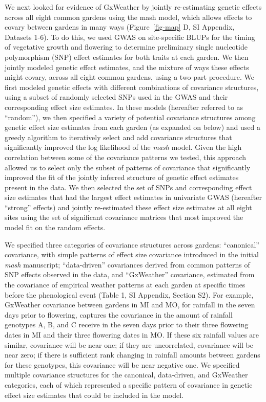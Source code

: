 \documentclass[
  9pt,
  twocolumn,
  twoside]{pnas-new}
\begin{document}
We next looked for evidence of GxWeather by jointly re-estimating
genetic effects across all eight common gardens using the mash model,
which allows effects to covary between gardens in many ways
(Figure~\ref{fig-map} D, SI Appendix, Datasets 1-6). To do this, we used
GWAS on site-specific BLUPs for the timing of vegetative growth and
flowering to determine preliminary single nucleotide polymorphism (SNP)
effect estimates for both traits at each garden. We then jointly modeled
genetic effect estimates, and the mixture of ways these effects might
covary, across all eight common gardens, using a two-part procedure. We
first modeled genetic effects with different combinations of covariance
structures, using a subset of randomly selected SNPs used in the GWAS
and their corresponding effect size estimates. In these models
(hereafter referred to as ``random''), we then specified a variety of
potential covariance structures among genetic effect size estimates from
each garden (as expanded on below) and used a greedy algorithm to
iteratively select and add covariance structures that significantly
improved the log likelihood of the \emph{mash} model. Given the high
correlation between some of the covariance patterns we tested, this
approach allowed us to select only the subset of patterns of covariance
that significantly improved the fit of the jointly inferred structure of
genetic effect estimates present in the data. We then selected the set
of SNPs and corresponding effect size estimates that had the largest
effect estimates in univariate GWAS (hereafter ``strong'' effects) and
jointly re-estimated these effect size estimates at all eight sites
using the set of significant covariance matrices that most improved the
model fit on the random effects.

We specified three categories of covariance structures across gardens:
``canonical'' covariance, with simple patterns of effect size covariance
introduced in the initial \emph{mash} manuscript; ``data-driven''
covariances derived from common patterns of SNP effects observed in the
data, and ``GxWeather'' covariance, estimated from the covariance of
empirical weather patterns at each garden at specific times before the
phenological event (Table 1, SI Appendix, Section S2). For example,
GxWeather covariance between gardens in MI and MO, for rainfall in the
seven days prior to flowering, captures the covariance in the amount of
rainfall genotypes A, B, and C receive in the seven days prior to their
three flowering dates in MI and their three flowering dates in MO. If
these six rainfall values are similar, covariance will be near one; if
they are uncorrelated, covariance will be near zero; if there is
sufficient rank changing in rainfall amounts between gardens for these
genotypes, this covariance will be near negative one. We specified
multiple covariance structures for the canonical, data-driven, and
GxWeather categories, each of which represented a specific pattern of
covariance in genetic effect size estimates that could be included in
the model.
\end{document}
